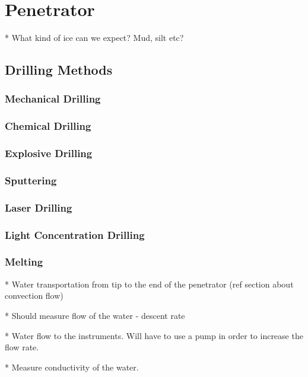 \chapter{Penetrator}

* What kind of ice can we expect? Mud, silt etc?

\section{Drilling Methods}

\subsection{Mechanical Drilling}

\subsection{Chemical Drilling}

\subsection{Explosive Drilling}

\subsection{Sputtering}

\subsection{Laser Drilling}

\subsection{Light Concentration Drilling}

\subsection{Melting}

* Water transportation from tip to the end of the penetrator (ref section about convection flow)

* Should measure flow of the water - descent rate

* Water flow to the instruments. Will have to use a pump in order to increase the flow rate.

* Measure conductivity of the water.


